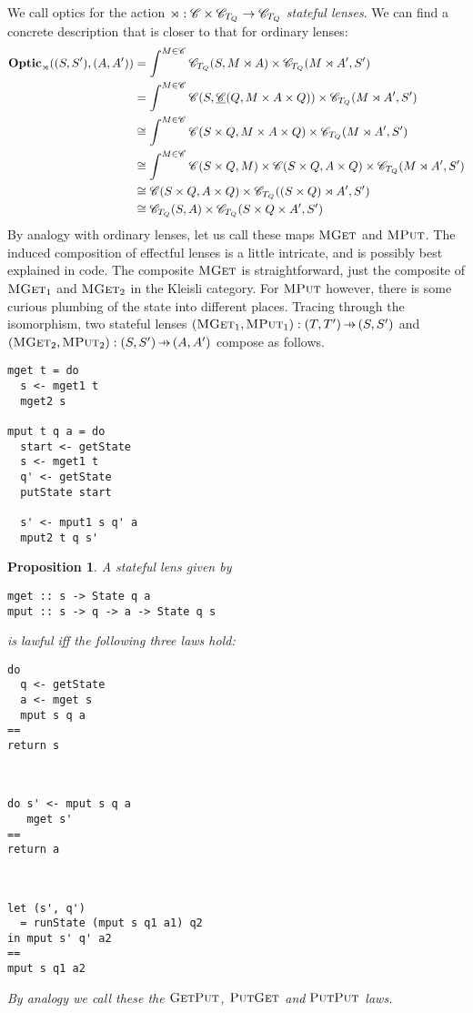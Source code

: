\documentclass[11pt,letterpaper]{article}
\theoremstyle{plain}
\newtheorem{proposition}[theorem]{Proposition}
\theoremstyle{definition}
\newcommand{\C}{\mathscr{C}}
\newcommand{\homC}{\underline{\C}}
\newcommand{\Optic}{\mathbf{Optic}}
\newcommand{\fget}{\textsc{Get}}
\newcommand{\fput}{\textsc{Put}}
\newcommand{\mget}{\textsc{MGet}}
\newcommand{\mput}{\textsc{MPut}}
\newcommand{\hto}{\ensuremath{\,\mathaccent\shortmid\rightarrow\,}}
\begin{document}
We call optics for the action $\monact : \C \times \C_{T_Q} \to \C_{T_Q}$ \emph{stateful lenses}. We can find a concrete description that is closer to that for ordinary lenses:
\begin{align*}
\Optic_\monact((S, S'), (A, A'))
&= \int^{M \in \C} \C_{T_Q}(S, M \monact A) \times \C_{T_Q}(M \monact A', S') \\
&= \int^{M \in \C} \C(S, \homC(Q, M \times A \times Q)) \times \C_{T_Q}(M \monact A', S') \\
&\cong \int^{M \in \C} \C(S \times Q, M \times A\times Q) \times \C_{T_Q}(M \monact A', S') \\
&\cong \int^{M \in \C} \C(S \times Q, M) \times \C(S \times Q, A\times Q) \times \C_{T_Q}(M \monact A', S') \\
&\cong \C(S \times Q, A \times Q) \times \C_{T_Q}((S \times Q) \monact A', S') \\
&\cong \C_{T_Q}(S, A) \times \C_{T_Q}(S \times Q \times A', S')
\end{align*}
By analogy with ordinary lenses, let us call these maps $\mget$ and $\mput$. 
The induced composition of effectful lenses is a little intricate, and is possibly best explained in code. The composite $\mget$ is straightforward, just the composite of $\mget_1$ and $\mget_2$ in the Kleisli category. For $\mput$ however, there is some curious plumbing of the state into different places. Tracing through the isomorphism, two stateful lenses $(\mget_1, \mput_1) : (T, T') \hto (S, S')$ and $(\mget_2, \mput_2) : (S, S') \hto (A, A')$ compose as follows. 
\begin{verbatim}
mget t = do
  s <- mget1 t
  mget2 s

mput t q a = do 
  start <- getState
  s <- mget1 t
  q' <- getState
  putState start

  s' <- mput1 s q' a
  mput2 t q s'
\end{verbatim}

\begin{proposition}
A stateful lens given by
\begin{verbatim}
mget :: s -> State q a
mput :: s -> q -> a -> State q s
\end{verbatim}
is lawful iff the following three laws hold: \\
\begin{minipage}{\textwidth}
\begin{multicols}{3}
\begin{verbatim}
do
  q <- getState
  a <- mget s
  mput s q a
==
return s
\end{verbatim}
~\columnbreak
\begin{verbatim}
do s' <- mput s q a
   mget s'
==
return a
\end{verbatim}
~\columnbreak
\begin{verbatim}
let (s', q')
  = runState (mput s q1 a1) q2
in mput s' q' a2
==
mput s q1 a2
\end{verbatim}
\end{multicols}
\end{minipage}
By analogy we call these the $\fget\fput$, $\fput\fget$ and $\fput\fput$ laws.
\end{proposition}
\end{document}
